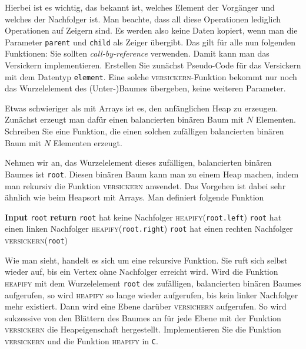 \documentclass[tikz,12pt]{article}
\begin{document}
Hierbei ist es wichtig, das bekannt ist, welches Element der Vorgänger und welches der Nachfolger ist. 
Man beachte, dass all diese Operationen lediglich Operationen auf Zeigern sind. 
Es werden also keine Daten kopiert, wenn man die Parameter \texttt{parent} und \texttt{child} als Zeiger übergibt.
Das gilt für alle nun folgenden Funktionen: Sie sollten \emph{call-by-reference} verwenden.
Damit kann man das Versickern implementieren.
Erstellen Sie zunächst Pseudo-Code für das Versickern mit dem Datentyp \texttt{element}.
Eine solche \textsc{versickern}-Funktion bekommt nur noch das Wurzelelement des (Unter-)Baumes übergeben, keine weiteren Parameter.

Etwas schwieriger als mit Arrays ist es, den anfänglichen Heap zu erzeugen.
Zunächst erzeugt man dafür einen balancierten binären Baum mit $N$ Elementen.
Schreiben Sie eine Funktion, die einen solchen zufälligen balancierten binären Baum mit $N$ Elementen erzeugt.

Nehmen wir an, das Wurzelelement dieses zufälligen, balancierten binären Baumes ist \texttt{root}.
Diesen binären Baum kann man zu einem Heap machen, indem man rekursiv die Funktion \textsc{versickern} anwendet.
Das Vorgehen ist dabei sehr ähnlich wie beim Heapsort mit Arrays.
Man definiert folgende Funktion
\begin{algorithmic}[1]
  \State\textbf{Input} \texttt{root}
  \State\textbf{return}
  \Comment \texttt{root} hat keine Nachfolger
  \Else
  \State\textsc{heapify}(\texttt{root.left})
  \Comment \texttt{root} hat einen linken Nachfolger
  \EndIf
  \State\textsc{heapify}(\texttt{root.right})
  \Comment \texttt{root} hat einen rechten Nachfolger
  \EndIf
  \State\textsc{versickern}(\texttt{root})
  \EndProcedure
\end{algorithmic}
Wie man sieht, handelt es sich um eine rekursive Funktion.
Sie ruft sich selbst wieder auf, bis ein Vertex ohne Nachfolger erreicht wird.
Wird die Funktion \textsc{heapify} mit dem Wurzelelement \texttt{root} des zufälligen, balancierten binären Baumes aufgerufen, so wird \textsc{heapify} so lange wieder aufgerufen, bis kein linker Nachfolger mehr existiert.
Dann wird eine Ebene darüber \textsc{versichern} aufgerufen.
So wird sukzessive von den Blättern des Baumes an für jede Ebene mit der Funktion \textsc{versickern} die Heapeigenschaft hergestellt. 
Implementieren Sie die Funktion \textsc{versickern} und die Funktion \textsc{heapify} in \texttt{C}.
\end{document}
